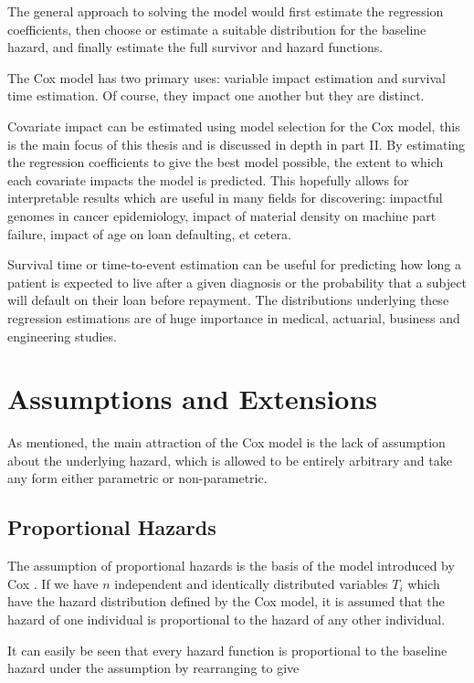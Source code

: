 The general approach to solving the model would first estimate the regression coefficients, then choose or estimate a suitable distribution for the baseline hazard, and finally estimate the full survivor and hazard functions.

The Cox model has two primary uses: variable impact estimation and survival time estimation. Of course, they impact one another but they are distinct.

Covariate impact can be estimated using model selection for the Cox model, this is the main focus of this thesis and is discussed in depth in part II. By estimating the regression coefficients to give the best model possible, the extent to which each covariate impacts the model is predicted. This hopefully allows for interpretable results which are useful in many fields for discovering: impactful genomes in cancer epidemiology, impact of material density on machine part failure, impact of age on loan defaulting, et cetera. 

Survival time or time-to-event estimation can be useful for predicting how long a patient is expected to live after a given diagnosis or the probability that a subject will default on their loan before repayment. The distributions underlying these regression estimations are of huge importance in medical, actuarial, business and engineering studies.

\section{Assumptions and Extensions}\label{assumptions}

As mentioned, the main attraction of the Cox model is the lack of assumption about the underlying hazard, which is allowed to be entirely arbitrary and take any form either parametric or non-parametric.

\subsection{Proportional Hazards}

The assumption of proportional hazards is the basis of the model introduced by Cox . If we have $n$ independent and identically distributed variables $T_i$ which have the hazard distribution defined by the Cox model, it is assumed that the hazard of one individual is proportional to the hazard of any other individual.

It can easily be seen that every hazard function is proportional to the baseline hazard under the assumption by rearranging  to give

